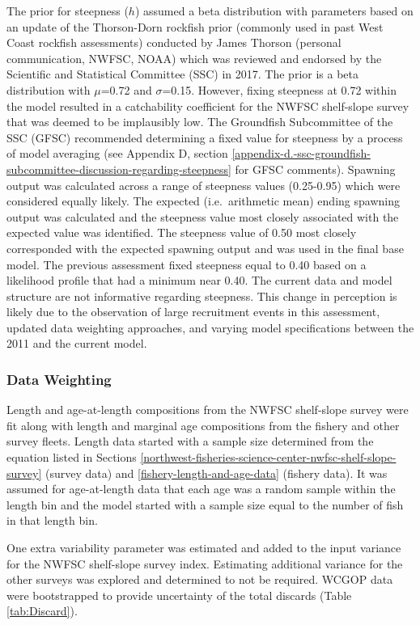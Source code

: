\documentclass[12pt,]{article}
\begin{document}
The prior for steepness (\(h\)) assumed a beta distribution with
parameters based on an update of the Thorson-Dorn rockfish prior
(commonly used in past West Coast rockfish assessments) conducted by
James Thorson (personal communication, NWFSC, NOAA) which was reviewed
and endorsed by the Scientific and Statistical Committee (SSC) in 2017.
The prior is a beta distribution with \(\mu\)=0.72 and \(\sigma\)=0.15.
However, fixing steepness at 0.72 within the model resulted in a
catchability coefficient for the NWFSC shelf-slope survey that was
deemed to be implausibly low. The Groundfish Subcommittee of the SSC
(GFSC) recommended determining a fixed value for steepness by a process
of model averaging (see Appendix D, section
\ref{appendix-d.-ssc-groundfish-subcommittee-discussion-regarding-steepness}
for GFSC comments). Spawning output was calculated across a range of
steepness values (0.25-0.95) which were considered equally likely. The
expected (i.e.~arithmetic mean) ending spawning output was calculated
and the steepness value most closely associated with the expected value
was identified. The steepness value of 0.50 most closely corresponded
with the expected spawning output and was used in the final base model.
The previous assessment fixed steepness equal to 0.40 based on a
likelihood profile that had a minimum near 0.40. The current data and
model structure are not informative regarding steepness. This change in
perception is likely due to the observation of large recruitment events
in this assessment, updated data weighting approaches, and varying model
specifications between the 2011 and the current model.

\subsubsection{Data Weighting}\label{data-weighting}

Length and age-at-length compositions from the NWFSC shelf-slope survey
were fit along with length and marginal age compositions from the
fishery and other survey fleets. Length data started with a sample size
determined from the equation listed in Sections
\ref{northwest-fisheries-science-center-nwfsc-shelf-slope-survey}
(survey data) and \ref{fishery-length-and-age-data} (fishery data). It
was assumed for age-at-length data that each age was a random sample
within the length bin and the model started with a sample size equal to
the number of fish in that length bin.

One extra variability parameter was estimated and added to the input
variance for the NWFSC shelf-slope survey index. Estimating additional
variance for the other surveys was explored and determined to not be
required. WCGOP data were bootstrapped to provide uncertainty of the
total discards (Table \ref{tab:Discard}).
\end{document}
